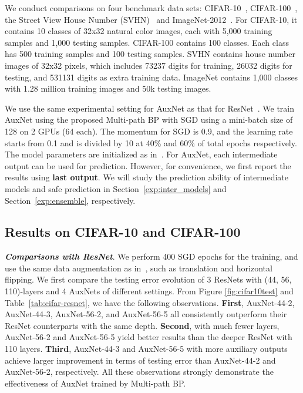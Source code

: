 \documentclass[10pt,onecolumn,letterpaper]{article}
\def\SexyName{AuxNet\xspace}
\begin{document}
We conduct comparisons on four benchmark data sets: CIFAR-10~\cite{krizhevsky2009learning}, CIFAR-100~\cite{krizhevsky2009learning}, the Street View House Number (SVHN)~\cite{netzer2011reading} and ImageNet-2012~\cite{russakovsky2015imagenet}.
For CIFAR-10, it contains 10 classes of 32x32 natural color images, each with 5,000 training samples
and 1,000 testing samples. CIFAR-100 contains 100 classes. Each class has 500 training samples and 100 testing samples.
SVHN contains house number images of 32x32 pixels, which includes 73237 digits for training, 26032 digits for testing, and 531131 digits as extra training data.
ImageNet contains 1,000 classes with 1.28 million training images and 50k testing images.

We use the same experimental setting for \SexyName as that for ResNet~\cite{he2015deep}. We train AuxNet using the proposed Multi-path BP with SGD using a mini-batch size of 128 on 2 GPUs (64 each). The momentum for SGD is 0.9, and the learning rate starts from 0.1 and is divided by 10 at 40\% and 60\% of total epochs respectively.  The model parameters are initialized as in~\cite{he2015delving}. For AuxNet, each intermediate output can be used for prediction. However, for convenience, we first report the results using \textbf{last output}. We will study the prediction ability of intermediate models and safe prediction in Section~\ref{exp:inter_models} and Section~\ref{exp:ensemble}, respectively.







\subsection{Results on CIFAR-10 and CIFAR-100}\label{exp:main_results}
\noindent \emph{\textbf{Comparisons with ResNet}}.
We perform 400 SGD epochs for the training, and use the same data augmentation as in~\cite{Lee2015}, such as translation and horizontal flipping.
We first compare  the testing error evolution of 3 ResNets with (44, 56, 110)-layers  and 4 AuxNets of different settings. From Figure \ref{fig:cifar10test} and Table~\ref{tab:cifar-resnet}, we have the following observations.
\textbf{First}, \SexyName-44-2, \SexyName-44-3, \SexyName-56-2, and \SexyName-56-5 all consistently outperform their ResNet counterparts with the same depth.
\textbf{Second}, with much fewer layers, \SexyName-56-2 and \SexyName-56-5 yield better results than the deeper ResNet with 110 layers.
\textbf{Third}, \SexyName-44-3 and \SexyName-56-5 with more auxiliary outputs achieve larger improvement in terms of testing error than \SexyName-44-2 and \SexyName-56-2, respectively. All these observations strongly demonstrate the effectiveness of \SexyName trained by Multi-path BP.
\end{document}
